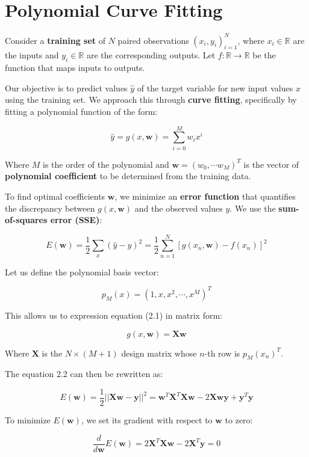 \section{Polynomial Curve Fitting}\label{sec:polynomial_curve_fitting}

Consider a \textbf{training set} of $N$ paired observations $(x_i, y_i)_{i=1}^N$, where $x_i \in \mathbb{R}$ are the inputs and $y_i \in \mathbb{R}$ are the corresponding outputs.
Let $f: \mathbb{R} \to \mathbb{R}$ be the function that maps inputs to outputs.

Our objective is to predict values $\hat{y}$ of the target variable for new input values $x$ using the training set.
We approach this through \textbf{curve fitting}, specifically by fitting a polynomial function of the form:

\[
    \hat{y} = g(x, \mathbf{w}) = \sum_{i = 0}^{M}{w_{i}x^i} \tag{2.1}
\]

Where $M$ is the order of the polynomial and $\mathbf{w} = (w_0, \cdots w_M)^T$ is the vector of \textbf{polynomial coefficient} to be determined from the training data.

To find optimal coefficients $\mathbf{w}$, we minimize an \textbf{error function} that quantifies the discrepancy between $g(x, \mathbf{w})$ and the observed values $y$.
We use the \textbf{sum-of-squares error (SSE)}:

\[
    E(\mathbf{w})
    = \frac{1}{2}\sum_{x}{ (\hat{y} - y)^2 }
    = \frac{1}{2}\sum_{n = 1}^{N}{ \left[ g(x_n, \mathbf{w}) - f(x_n) \right]^2 } \tag{2.2}
\]

Let us define the polynomial basis vector:

\[
    p_M(x) = (1, x, x^2, \cdots, x^M)^T
\]

This allows us to expression equation (2.1) in matrix form:

\[
    g(x, \mathbf{w}) = \mathbf{Xw} \tag{2.3}
\]

Where $\mathbf{X}$ is the $N \times (M + 1)$ design matrix whose $n$-th row is $p_M(x_n)^T$.

The equation 2.2 can then be rewritten as:

\[
    E(\mathbf{w})
    = \frac{1}{2} || \mathbf{Xw} - \mathbf{y} ||^2
    = \mathbf{w}^T\mathbf{X}^T\mathbf{Xw} - 2\mathbf{Xwy} + \mathbf{y}^{T}\mathbf{y} \tag{2.4}
\]

To minimize $E(\mathbf{w})$, we set its gradient with respect to $\mathbf{w}$ to zero:

\[
    \frac{d}{d\mathbf{w}}E(\mathbf{w})
    = 2\mathbf{X}^T\mathbf{Xw} - 2\mathbf{X}^T\mathbf{y} = 0
\]

